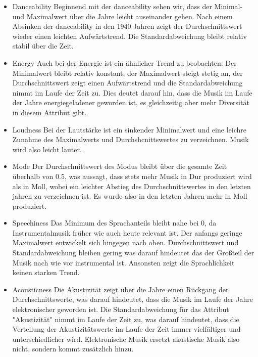 \documentclass[conference]{IEEEtran}
\begin{document}
\begin{itemize}
\item{Danceability} Beginnend mit der danceability sehen wir, dass der Minimal- und Maximalwert über die Jahre leicht auseinander gehen. Nach einem Absinken der danceability in den 1940 Jahren zeigt der Durchschnittswert wieder einen leichten Aufwärtstrend. Die Standardabweichung bleibt relativ stabil über die Zeit.

\item{Energy} Auch bei der Energie ist ein ähnlicher Trend zu beobachten: Der Minimalwert bleibt relativ konstant, der Maximalwert steigt stetig an, der Durchschnittswert zeigt einen Aufwärtstrend und die Standardabweichung nimmt im Laufe der Zeit zu. Dies deutet darauf hin, dass die Musik im Laufe der Jahre energiegeladener geworden ist, es gleichzeitig aber mehr Diversität in diesem Attribut gibt.

\item{Loudness} Bei der Lautstärke ist ein sinkender Minimalwert und eine leichre Zunahme des Maximalwerts und Durchshcnittswertes zu verzeichnen. Musik wird also leicht lauter.

\item{Mode} Der Durchschnittswert des Modus bleibt über die gesamte Zeit überhalb von 0.5, was aussagt, dass stets mehr Musik in Dur produziert wird als in Moll, wobei ein leichter Abstieg des Durchschnittswertes in den letzten jahren zu verzeichnen ist. Es wurde also in den letzten Jahren mehr in Moll produziert.

\item{Speechiness} Das Minimum des Sprachanteils bleibt nahe bei 0, da Instrumentalmusik früher wie auch heute relevant ist. Der anfangs geringe Maximalwert entwickelt sich hingegen nach oben. Durchschnittswert und Standardabweichung bleiben gering was darauf hindeutet das der Großteil der Musik nach wie vor instrumental ist. Ansonsten zeigt die Sprachlichkeit keinen starken Trend.

\item{Acousticness} Die Akustizität zeigt über die Jahre einen Rückgang der Durchschnittswerte, was darauf hindeutet, dass die Musik im Laufe der Jahre elektronischer geworden ist. Die Standardabweichung für das Attribut "Akustizität" nimmt im Laufe der Zeit zu, was darauf hindeutet, dass die Verteilung der Akustizitätswerte im Laufe der Zeit immer vielfältiger und unterschiedlicher wird. Elektronische Musik ersetzt akustische Musik also nicht, sondern kommt zusätzlich hinzu. 


\end{itemize}
\end{document}
